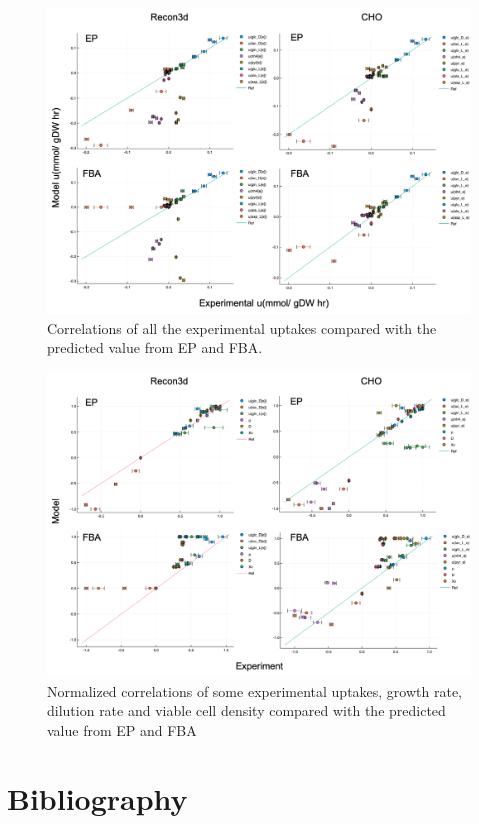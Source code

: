 \documentclass[]{article}
\begin{document}
	\begin{figure}[h]
		\includegraphics[scale = 0.5]{rich_medium_2}
		\caption{Correlations of all the experimental uptakes compared with the predicted value from EP and FBA.}
		
	\end{figure}
	
	\begin{figure}[h]
		\includegraphics[scale = 0.5]{rich_medium_3}
		\caption{Normalized correlations of some experimental uptakes, growth rate, dilution rate and viable cell density compared with the predicted value from EP and FBA}
		
	\end{figure}

\section{Bibliography} %
		
\end{document}
